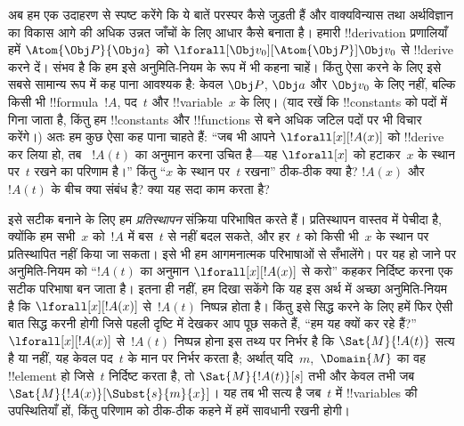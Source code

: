 \documentclass[../../../include/open-logic-section]{subfiles}
\begin{document}


अब हम एक उदाहरण से स्पष्ट करेंगे कि ये बातें परस्पर कैसे जुड़ती हैं और
वाक्यविन्यास तथा अर्थविज्ञान का विकास आगे की अधिक उन्नत जाँचों के लिए आधार
कैसे बनाता है। हमारी !!{derivation} प्रणालियाँ हमें
$\Atom{\Obj P}{\Obj a}$ को $\lforall[\Obj
v_0][\Atom{\Obj P}]{\Obj v_0}$ से !!{derive} करने दें। संभव है कि हम इसे
अनुमिति-नियम के रूप में भी कहना चाहें। किंतु ऐसा करने के लिए इसे सबसे सामान्य
रूप में कह पाना आवश्यक है: केवल $\Obj P$, $\Obj a$ और $\Obj
v_0$ के लिए
नहीं, बल्कि किसी भी !!{formula}~$!A$, पद~$t$ और !!{variable}~$x$ के लिए।
(याद रखें कि !!{constant}s को पदों में गिना जाता है, किंतु हम !!{constant}s और !!{function}s
से बने अधिक जटिल पदों पर भी विचार करेंगे।) अतः हम कुछ ऐसा कह पाना चाहते हैं:
``जब भी आपने $\lforall[x][!A(x)]$ को !!{derive} कर लिया हो, तब
~$!A(t)$ का अनुमान करना उचित है---यह $\lforall[x]$ को हटाकर~$x$ के स्थान
पर~$t$ रखने का परिणाम है।'' किंतु ``$x$ के स्थान पर~$t$ रखना'' ठीक-ठीक क्या
है? $!A(x)$ और~$!A(t)$ के बीच क्या संबंध है? क्या यह सदा काम करता है?

इसे सटीक बनाने के लिए हम \emph{प्रतिस्थापन} संक्रिया परिभाषित करते हैं।
प्रतिस्थापन वास्तव में पेचीदा है, क्योंकि हम सभी~$x$ को~$!A$ में बस~$t$
से नहीं बदल सकते, और हर~$t$ को किसी भी~$x$ के स्थान पर प्रतिस्थापित नहीं
किया जा सकता। इसे भी हम आगमनात्मक परिभाषाओं से सँभालेंगे। पर यह हो जाने पर
अनुमिति-नियम को ``$!A(t)$ का अनुमान $\lforall[x][!A(x)]$ से करो'' कहकर
निर्दिष्ट करना एक सटीक परिभाषा बन जाता है। इतना ही नहीं, हम दिखा सकेंगे कि
यह इस अर्थ में अच्छा अनुमिति-नियम है कि $\lforall[x][!A(x)]$ से~$!A(t)$
निष्पन्न होता है। किंतु इसे सिद्ध करने के लिए हमें फिर ऐसी बात सिद्ध करनी
होगी जिसे पहली दृष्टि में देखकर आप पूछ सकते हैं, ``हम यह क्यों कर रहे हैं?''
$\lforall[x][!A(x)]$ से~$!A(t)$ निष्पन्न होना इस तथ्य पर निर्भर है कि
$\Sat{M}{!A(t)}$ सत्य है या नहीं, यह केवल पद~$t$ के मान पर निर्भर करता है;
अर्थात् यदि~$m$,~$\Domain{M}$ का वह !!{element} हो जिसे~$t$ निर्दिष्ट करता
है, तो
$\Sat{M}{!A(t)}[s]$ तभी और केवल तभी जब
$\Sat{M}{!A(x)}[\Subst{s}{m}{x}]$। यह तब भी सत्य है जब~$t$ में
!!{variable}s की उपस्थितियाँ हों, किंतु परिणाम को ठीक-ठीक कहने में हमें सावधानी रखनी होगी।
\end{document}
